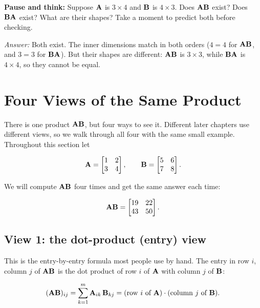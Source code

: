\begin{recoverybox}
\textbf{Pause and think:} Suppose $\mathbf{A}$ is $3\times 4$ and $\mathbf{B}$ is $4\times 3$.
Does $\mathbf{A}\mathbf{B}$ exist? Does $\mathbf{B}\mathbf{A}$ exist? What are their shapes?
Take a moment to predict both before checking.

\emph{Answer:} Both exist. The inner dimensions match in both orders ($4=4$ for
$\mathbf{A}\mathbf{B}$, and $3=3$ for $\mathbf{B}\mathbf{A}$). But their shapes are
different: $\mathbf{A}\mathbf{B}$ is $3\times 3$, while $\mathbf{B}\mathbf{A}$ is $4\times 4$,
so they cannot be equal.
\end{recoverybox}

\section{Four Views of the Same Product}
\label{ch08:fourviews}

There is one product $\mathbf{A}\mathbf{B}$, but four ways to see it. Different later
chapters use different views, so we walk through all four with the same small example.
Throughout this section let

\[
\mathbf{A} = \begin{bmatrix} 1 & 2 \\ 3 & 4 \end{bmatrix},
\qquad
\mathbf{B} = \begin{bmatrix} 5 & 6 \\ 7 & 8 \end{bmatrix}.
\]

We will compute $\mathbf{A}\mathbf{B}$ four times and get the same answer each time:

\[
\mathbf{A}\mathbf{B} = \begin{bmatrix} 19 & 22 \\ 43 & 50 \end{bmatrix}.
\]

\subsection{View 1: the dot-product (entry) view}

This is the entry-by-entry formula most people use by hand. The entry in row $i$,
column $j$ of $\mathbf{A}\mathbf{B}$ is the dot product of row $i$ of $\mathbf{A}$ with column
$j$ of $\mathbf{B}$:

\[
(\mathbf{A}\mathbf{B})_{ij} = \sum_{k=1}^{m} \mathbf{A}_{ik}\,\mathbf{B}_{kj}
= (\text{row } i \text{ of } \mathbf{A}) \cdot (\text{column } j \text{ of } \mathbf{B}).
\]

